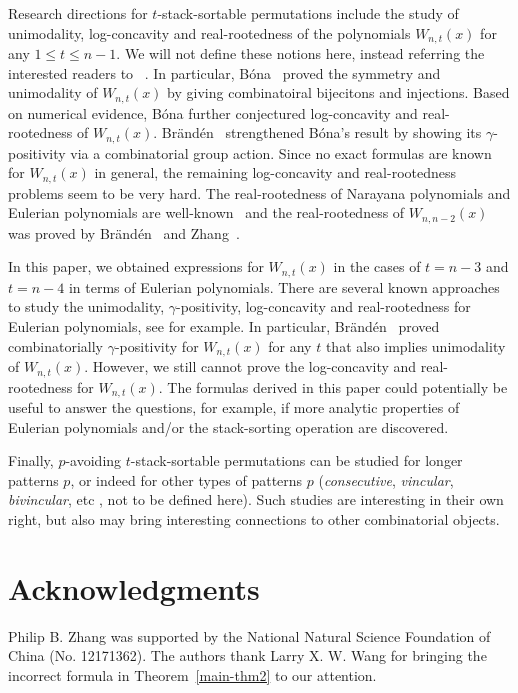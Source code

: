 \documentclass[11pt]{article}
\newcommand{\+}{\mbox{\ensuremath{\scriptstyle{+}}}}
\begin{document}
Research directions for $t$-stack-sortable permutations include the  study of unimodality, log-concavity and real-rootedness  of the polynomials $W_{n,t}(x)$ for any $1 \le t \le n-1$.
We will not define these notions here, instead referring the interested readers to ~\cite{Bona2002Symmetry,Braenden2008Actions,Braenden2015Unimodality,Brenti1994Log,Stanley1989Log}. In particular, B\'ona~\cite{Bona2002Symmetry} proved  the symmetry and unimodality of $W_{n,t}(x)$ by giving combinatoiral bijecitons and injections.  Based on numerical evidence, B\'ona further conjectured log-concavity and real-rootedness of $W_{n,t}(x)$.
Br{\"a}nd{\'e}n~\cite{Braenden2008Actions} strengthened B\'ona's result by showing its $\gamma$-positivity via a combinatorial group action.
Since no exact formulas are known for  $W_{n,t}(x)$ in general, the remaining log-concavity and real-rootedness problems seem to be very hard. The real-rootedness of Narayana polynomials and Eulerian polynomials are well-known~\cite{Liu2007unified} and the real-rootedness of $W_{n,n-2}(x)$ was  proved by  Br{\"a}nd{\'e}n~\cite{Braenden2006linear} and Zhang~\cite{Zhang2015real}.


In this paper,  we obtained expressions for $W_{n,t}(x)$ in the cases of $t=n-3$ and $t=n-4$ in terms of Eulerian polynomials. There are several known approaches to study the unimodality, $\gamma$-positivity,  log-concavity and  real-rootedness for Eulerian polynomials, see \cite{Braenden2008Actions, Braenden2015Unimodality} for example. In particular, Br{\"a}nd{\'e}n~\cite{Braenden2008Actions} proved combinatorially $\gamma$-positivity for $W_{n,t}(x)$ for any $t$ that also implies unimodality of $W_{n,t}(x)$. However, we still cannot prove the  log-concavity and  real-rootedness for $W_{n,t}(x)$. The formulas derived in this paper could potentially be useful to answer the questions, for example, if more analytic properties of Eulerian polynomials and/or the stack-sorting operation are discovered.

Finally, $p$-avoiding $t$-stack-sortable permutations can be studied for longer patterns $p$, or indeed for other types of patterns $p$ ({\em consecutive}, {\em vincular}, {\em bivincular}, etc \cite{Kitaev2011Patterns}, not to be defined here). Such studies are interesting in their own right, but also may bring interesting connections to other combinatorial objects.

\vskip 3mm
\section*{Acknowledgments}
Philip B. Zhang was supported by the National Natural Science Foundation of China (No. 12171362).
The authors thank Larry X. W. Wang for bringing the incorrect formula in Theorem~\ref{main-thm2} to our attention.
\end{document}
